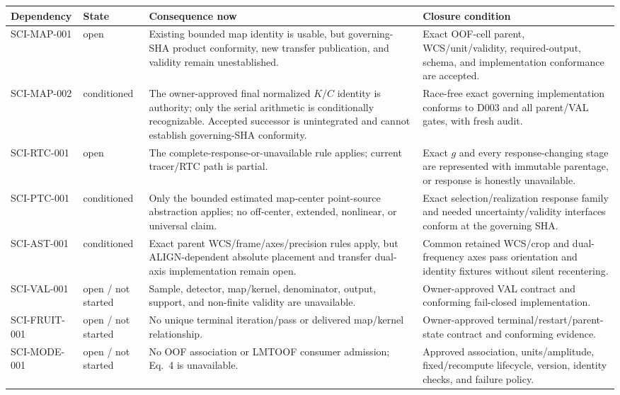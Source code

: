 \documentclass[10pt]{article}
\newcommand{\code}[1]{\texttt{\detokenize{#1}}}
\begin{document}
\begin{longtable}{@{}L{0.14\textwidth}L{0.16\textwidth}L{0.34\textwidth}L{0.28\textwidth}@{}}
\toprule
Dependency & State & Consequence now & Closure condition \\
\midrule
\endhead
SCI-MAP-001 & open &
Existing bounded map identity is usable, but governing-SHA product conformity,
new transfer publication, and validity remain unestablished. &
Exact OOF-cell parent, WCS/unit/validity, required-output, schema, and
implementation conformance are accepted. \\
SCI-MAP-002 & conditioned &
The owner-approved final normalized $K/C$ identity is authority; only the
serial arithmetic is conditionally recognizable.  Accepted successor
\code{86f1582} is unintegrated and cannot establish governing-SHA conformity. &
Race-free exact governing implementation conforms to D003 and all parent/VAL
gates, with fresh audit. \\
SCI-RTC-001 & open &
The complete-response-or-unavailable rule applies; current tracer/RTC path is
partial. &
Exact $g$ and every response-changing stage are represented with immutable
parentage, or response is honestly unavailable. \\
SCI-PTC-001 & conditioned &
Only the bounded estimated map-center point-source abstraction applies; no
off-center, extended, nonlinear, or universal claim. &
Exact selection/realization response family and needed uncertainty/validity
interfaces conform at the governing SHA. \\
SCI-AST-001 & conditioned &
Exact parent WCS/frame/axes/precision rules apply, but ALIGN-dependent absolute
placement and transfer dual-axis implementation remain open. &
Common retained WCS/crop and dual-frequency axes pass orientation and identity
fixtures without silent recentering. \\
SCI-VAL-001 & open / not started &
Sample, detector, map/kernel, denominator, output, support, and non-finite
validity are unavailable. &
Owner-approved VAL contract and conforming fail-closed implementation. \\
SCI-FRUIT-001 & open / not started &
No unique terminal iteration/pass or delivered map/kernel relationship. &
Owner-approved terminal/restart/parent-state contract and conforming evidence. \\
SCI-MODE-001 & open / not started &
No OOF association or LMTOOF consumer admission; Eq.~4 is unavailable. &
Approved association, units/amplitude, fixed/recompute lifecycle, version,
identity checks, and failure policy. \\
\bottomrule
\end{longtable}
\end{document}
